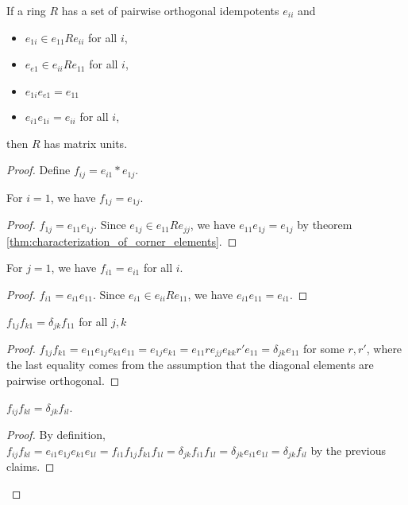   \begin{theorem}
    \label{thm:criterion_for_matrix_units}
    If a ring $R$ has a set of pairwise orthogonal idempotents $e_{ii}$ and
    \begin{itemize}
      \item $e_{1i} \in e_{11}Re_{ii}$ for all $i$,
      \item $e_{e1} \in e_{ii}Re_{11}$ for all $i$,
      \item $e_{1i}e_{e1} = e_{11}$ 
      \item $e_{i1}e_{1i} = e_{ii}$ for all $i$,
    \end{itemize}
    then $R$ has matrix units.
  \end{theorem}
  \begin{proof}
    Define $f_{ij} = e_{i1} * e_{1j}$.

    \begin{claim}
      For $i = 1$, we have $f_{1j} = e_{1j}$.
    \end{claim}
    \begin{proof}
      $f_{1j} = e_{11}e_{1j}$. Since $e_{1j} \in e_{11}Re_{jj}$, we have $e_{11}e_{1j} = e_{1j}$ by theorem \ref{thm:characterization_of_corner_elements}.
    \end{proof}
    \begin{claim}
      For $j = 1$, we have $f_{i1} = e_{i1}$ for all $i$.
    \end{claim}
    \begin{proof}
      $f_{i1} = e_{i1}e_{11}$. Since $e_{i1} \in e_{ii}Re_{11}$, we have $e_{i1}e_{11} = e_{i1}$.
    \end{proof}
    \begin{claim}
      $f_{1j} f_{k1} = \delta_{jk} f_{11}$ for all $j, k$
    \end{claim}
    \begin{proof}
      $f_{1j} f_{k1} = e_{11}e_{1j}e_{k1}e_{11} = e_{1j}e_{k1} = e_{11} r e_{jj} e_{kk} r' e_{11} = \delta_{jk} e_{11}$ for some $r, r'$, where the last equality comes from the assumption that the diagonal elements are pairwise orthogonal.
    \end{proof}

    \begin{claim}
      $f_{ij} f_{kl} = \delta_{jk} f_{il}$.
    \end{claim}
    \begin{proof}
      By definition, $f_{ij} f_{kl} = e_{i1}e_{1j} e_{k1}e_{1l} = f_{i1}f_{1j} f_{k1}f_{1l} = \delta_{jk} f_{i1} f_{1l} = \delta_{jk} e_{i1} e_{1l} = \delta_{jk} f_{il}$ by the previous claims.
    \end{proof}
  \end{proof}


